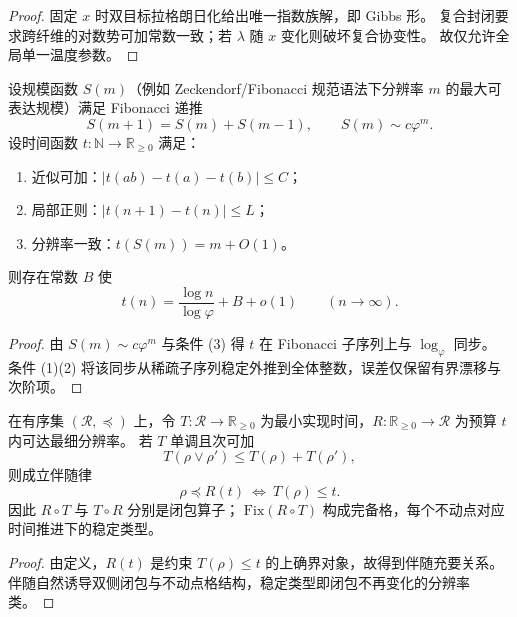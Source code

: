 \begin{proof}
固定 \(x\) 时双目标拉格朗日化给出唯一指数族解，即 Gibbs 形。
复合封闭要求跨纤维的对数势可加常数一致；若 \(\lambda\) 随 \(x\) 变化则破坏复合协变性。
故仅允许全局单一温度参数。
\end{proof}

\begin{theorem}\label{thm:xi-logphi-time-rigidity}
设规模函数 \(S(m)\)（例如 Zeckendorf/Fibonacci 规范语法下分辨率 \(m\) 的最大可表达规模）满足 Fibonacci 递推
\[
S(m+1)=S(m)+S(m-1),\qquad S(m)\sim c\varphi^m.
\]
设时间函数 \(t:\mathbb N\to\mathbb R_{\ge 0}\) 满足：
\begin{enumerate}
  \item 近似可加：\(|t(ab)-t(a)-t(b)|\le C\)；
  \item 局部正则：\(|t(n+1)-t(n)|\le L\)；
  \item 分辨率一致：\(t(S(m))=m+O(1)\)。
\end{enumerate}
则存在常数 \(B\) 使
\[
t(n)=\frac{\log n}{\log\varphi}+B+o(1)\qquad(n\to\infty).
\]
\end{theorem}

\begin{proof}
由 \(S(m)\sim c\varphi^m\) 与条件 (3) 得 \(t\) 在 Fibonacci 子序列上与 \(\log_\varphi\) 同步。
条件 (1)(2) 将该同步从稀疏子序列稳定外推到全体整数，误差仅保留有界漂移与次阶项。
\end{proof}

\begin{theorem}\label{thm:xi-time-resolution-galois-adjunction}
在有序集 \((\mathcal R,\preceq)\) 上，令 \(T:\mathcal R\to\mathbb R_{\ge 0}\) 为最小实现时间，\(R:\mathbb R_{\ge 0}\to\mathcal R\) 为预算 \(t\) 内可达最细分辨率。
若 \(T\) 单调且次可加
\[
T(\rho\vee\rho')\le T(\rho)+T(\rho'),
\]
则成立伴随律
\[
\rho\preceq R(t)\ \Longleftrightarrow\ T(\rho)\le t.
\]
因此 \(R\circ T\) 与 \(T\circ R\) 分别是闭包算子；
\(\mathrm{Fix}(R\circ T)\) 构成完备格，每个不动点对应时间推进下的稳定类型。
\end{theorem}

\begin{proof}
由定义，\(R(t)\) 是约束 \(T(\rho)\le t\) 的上确界对象，故得到伴随充要关系。
伴随自然诱导双侧闭包与不动点格结构，稳定类型即闭包不再变化的分辨率类。
\end{proof}

